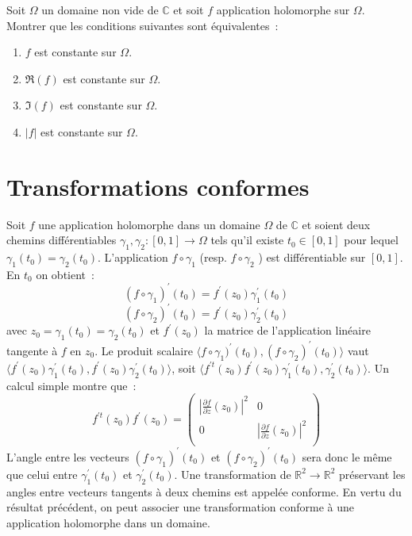 \begin{exercice}
Soit $\Omega$ un domaine non vide de $\mathbb{C}$ et soit $f$ application
holomorphe sur $\Omega$. Montrer que les conditions suivantes sont équivalentes~:
\renewcommand{\theenumi}{\alph{enumi}}
\begin{enumerate}
\item $f$ est constante sur $\Omega$.
\item $\Re(f)$ est constante sur $\Omega$.
\item $\Im(f)$ est constante sur $\Omega$.
\item $|f|$ est constante sur $\Omega$.
\end{enumerate}
\end{exercice}
\section{Transformations conformes}
Soit $f$ une application holomorphe dans un domaine $\Omega$ de
$\mathbb{C}$ et soient deux chemins différentiables $\gamma_1,
\gamma_2 : [0,1] \to \Omega$ tels qu'il existe $t_0 \in  [0,1]$ pour
lequel $\gamma_1(t_0) = \gamma_2(t_0)$. L'application $f \circ
\gamma_1$ (resp. $f \circ \gamma_2$ ) est différentiable sur
$[0,1]$. 
En $t_0$ on obtient~:
\[
(f \circ \gamma_1)^\prime (t_0) = f^\prime (z_0) \gamma_1^\prime (t_0) 
\]
\[
(f \circ \gamma_2)^\prime (t_0) = f^\prime (z_0) \gamma_2^\prime (t_0) 
\]
avec $z_0 = \gamma_1(t_0) = \gamma_2(t_0)$ et  $f^\prime(z_0)$ la matrice
de l'application linéaire tangente à $f$ en $z_0$.
Le produit scalaire $ \langle f \circ \gamma_1)^\prime (t_0),(f \circ
\gamma_2)^\prime (t_0) \rangle $ vaut $\langle  f^\prime (z_0)
\gamma_1^\prime (t_0) ,  f^\prime (z_0) \gamma_2^\prime (t_0) \rangle
$, soit  $\langle  f^{\prime t} (z_0)  f^\prime(z_0) \gamma_1^\prime
(t_0), \gamma_2^\prime (t_0) \rangle$. Un calcul simple montre que~:
\[
 f^{\prime t} (z_0)  f^\prime(z_0) = \left (
\begin{array}{cc}
|\frac{\partial f}{\partial z}(z_0)|^2 & 0 \\
0 & |\frac{\partial f}{\partial z}(z_0)|^2 \\
\end{array}
\right )
\]
L'angle entre les vecteurs $ (f \circ \gamma_1)^\prime (t_0)$ et $ (f
\circ \gamma_2)^\prime (t_0) $ sera donc le même que celui entre
$\gamma_1^\prime (t_0)$ et $ \gamma_2^\prime (t_0)$. Une
transformation de $\mathbb{R}^2 \to \mathbb{R}^2$ préservant les
angles entre vecteurs tangents à deux chemins est appelée conforme. En
vertu du résultat précédent, on peut associer une transformation
conforme à une application holomorphe dans un domaine.

